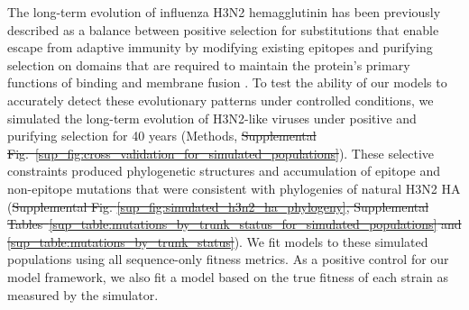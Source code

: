\documentclass[9pt,lineno]{elife} %
\providecommand{\DIFadd}[1]{{\protect\color{blue}\uwave{#1}}} %
\providecommand{\DIFdel}[1]{{\protect\color{red}\sout{#1}}}                      %
\providecommand{\DIFaddbegin}{} %
\providecommand{\DIFaddend}{} %
\providecommand{\DIFdelbegin}{} %
\providecommand{\DIFdelend}{} %
\providecommand{\DIFaddtex}[1]{{\protect\color{blue}\uwave{#1}}} %
\providecommand{\DIFdeltex}[1]{{\protect\color{red}\sout{#1}}}                      %
\providecommand{\DIFaddbegin}{} %
\providecommand{\DIFaddend}{} %
\providecommand{\DIFdelbegin}{} %
\providecommand{\DIFdelend}{} %
\providecommand{\DIFadd}[1]{\texorpdfstring{\DIFaddtex{#1}}{#1}} %
\providecommand{\DIFdel}[1]{\texorpdfstring{\DIFdeltex{#1}}{}} %
\newcommand{\DIFscaledelfig}{0.5}
\newlength{\DIFdelgraphicswidth} %
\newlength{\DIFdelgraphicsheight} %
\newcommand{\DIFaddincludegraphics}[2][]{{\color{blue}\fbox{\DIFOincludegraphics[#1]{#2}}}} %
\newcommand{\DIFdelincludegraphics}[2][]{%
\sbox{\DIFdelgraphicsbox}{\DIFOincludegraphics[#1]{#2}}%
\settoboxwidth{\DIFdelgraphicswidth}{\DIFdelgraphicsbox} %
\settoboxtotalheight{\DIFdelgraphicsheight}{\DIFdelgraphicsbox} %
\scalebox{\DIFscaledelfig}{%
\parbox[b]{\DIFdelgraphicswidth}{\usebox{\DIFdelgraphicsbox}\\[-\baselineskip] \rule{\DIFdelgraphicswidth}{0em}}\llap{\resizebox{\DIFdelgraphicswidth}{\DIFdelgraphicsheight}{%
\setlength{\unitlength}{\DIFdelgraphicswidth}%
\begin{picture}(1,1)%
\thicklines\linethickness{2pt} %
{\color[rgb]{1,0,0}\put(0,0){\framebox(1,1){}}}%
{\color[rgb]{1,0,0}\put(0,0){\line( 1,1){1}}}%
{\color[rgb]{1,0,0}\put(0,1){\line(1,-1){1}}}%
\end{picture}%
}\hspace*{3pt}}} %
} %
\DeclareRobustCommand{\DIFaddbegin}{\DIFOaddbegin \let\includegraphics\DIFaddincludegraphics} %
\DeclareRobustCommand{\DIFaddend}{\DIFOaddend \let\includegraphics\DIFOincludegraphics} %
\DeclareRobustCommand{\DIFdelbegin}{\DIFOdelbegin \let\includegraphics\DIFdelincludegraphics} %
\DeclareRobustCommand{\DIFdelend}{\DIFOaddend \let\includegraphics\DIFOincludegraphics} %
\begin{document}
The long-term evolution of influenza H3N2 hemagglutinin has been previously described as a balance between positive selection for substitutions that enable escape from adaptive immunity by modifying existing epitopes and purifying selection on domains that are required to maintain the protein's primary functions of binding and membrane fusion \DIFdelbegin %
\DIFdelend \DIFaddbegin \citep{Bush:1999vj,Neher2013,Luksza:2014hj,Koelle:2015dh}\DIFaddend .
To test the ability of our models to accurately detect these evolutionary patterns under controlled conditions, we simulated the long-term evolution of H3N2-like viruses under positive and purifying selection for 40 years (Methods, \DIFdelbegin \DIFdel{Supplemental Fig.~\ref{sup_fig:cross_validation_for_simulated_populations}}\DIFdelend \DIFaddbegin \DIFadd{Figure~\ref{fig:cross_validation_for_simulated_populations}}\DIFaddend ).
These selective constraints produced phylogenetic structures and accumulation of epitope and non-epitope mutations that were consistent with phylogenies of natural H3N2 HA (\DIFdelbegin \DIFdel{Supplemental Fig. \ref{sup_fig:simulated_h3n2_ha_phylogeny}, Supplemental Tables~\ref{sup_table:mutations_by_trunk_status_for_simulated_populations} and \ref{sup_table:mutations_by_trunk_status}}\DIFdelend \DIFaddbegin \DIFadd{Figure \ref{fig:simulated_h3n2_ha_phylogeny}, Tables~\ref{table:mutations_by_trunk_status_for_simulated_populations} and \ref{table:mutations_by_trunk_status}}\DIFaddend ).
We fit models to these simulated populations using all sequence-only fitness metrics.
As a positive control for our model framework, we also fit a model based on the true fitness of each strain as measured by the simulator.
\end{document}
